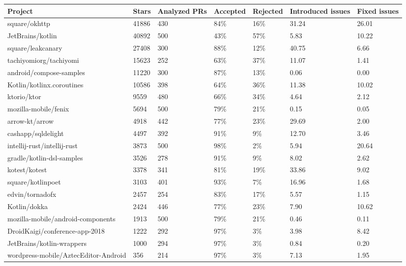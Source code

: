 \begin{tabular}{|p{4cm}p{0.8cm}p{1cm}p{1cm}p{1cm}p{1.2cm}p{0.8cm}|}
  \hline
Project & Stars & Analyzed PRs & Accepted & Rejected & Introduced issues & Fixed issues \\ 
  \hline \hline
square/okhttp & 41886 & 430 & 84\% & 16\% & 31.24 & 26.01 \\ 
  JetBrains/kotlin & 40892 & 500 & 43\% & 57\% & 5.83 & 10.22 \\ 
  square/leakcanary & 27408 & 300 & 88\% & 12\% & 40.75 & 6.66 \\ 
  tachiyomiorg/tachiyomi & 15623 & 252 & 63\% & 37\% & 11.07 & 1.41 \\ 
  android/compose-samples & 11220 & 300 & 87\% & 13\% & 0.06 & 0.00 \\ 
  Kotlin/kotlinx.coroutines & 10586 & 398 & 64\% & 36\% & 11.38 & 10.02 \\ 
  ktorio/ktor & 9559 & 480 & 66\% & 34\% & 4.64 & 2.12 \\ 
  mozilla-mobile/fenix & 5694 & 500 & 79\% & 21\% & 0.15 & 0.05 \\ 
  arrow-kt/arrow & 4918 & 442 & 77\% & 23\% & 29.69 & 2.00 \\ 
  cashapp/sqldelight & 4497 & 392 & 91\% & 9\% & 12.70 & 3.46 \\ 
  intellij-rust/intellij-rust & 3873 & 500 & 98\% & 2\% & 5.94 & 20.64 \\ 
  gradle/kotlin-dsl-samples & 3526 & 278 & 91\% & 9\% & 8.02 & 2.62 \\ 
  kotest/kotest & 3378 & 341 & 81\% & 19\% & 33.86 & 9.02 \\ 
  square/kotlinpoet & 3103 & 401 & 93\% & 7\% & 16.96 & 1.68 \\ 
  edvin/tornadofx & 2457 & 254 & 83\% & 17\% & 5.57 & 1.15 \\ 
  Kotlin/dokka & 2424 & 446 & 77\% & 23\% & 7.90 & 10.62 \\ 
  mozilla-mobile/android-components & 1913 & 500 & 79\% & 21\% & 0.46 & 0.11 \\ 
  DroidKaigi/conference-app-2018 & 1222 & 292 & 97\% & 3\% & 3.98 & 8.42 \\ 
  JetBrains/kotlin-wrappers & 1000 & 294 & 97\% & 3\% & 0.84 & 0.20 \\ 
  wordpress-mobile/AztecEditor-Android & 356 & 214 & 97\% & 3\% & 7.13 & 1.95 \\ 
   \hline
\end{tabular}
